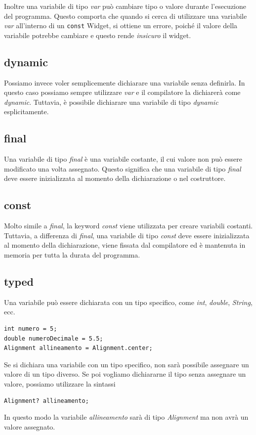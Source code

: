 \documentclass[12pt]{article}
\begin{document}
Inoltre una variabile di tipo \textit{var} può cambiare tipo o valore
durante l'esecuzione del programma.
Questo comporta che quando si cerca di utilizzare una variabile
\textit{var} all'interno di un \texttt{const} Widget, si ottiene
un errore, poiché il valore della variabile potrebbe cambiare e
questo rende \textit{insicuro} il widget.

\subsection{dynamic}
Possiamo invece voler semplicemente dichiarare una variabile
senza definirla. In questo caso possiamo sempre utilizzare \textit{var}
e il compilatore la dichiarerà come \textit{dynamic}.
Tuttavia, è possibile dichiarare una variabile di tipo \textit{dynamic}
esplicitamente.

\subsection{final}
Una variabile di tipo \textit{final} è una variabile costante,
il cui valore non può essere modificato una volta assegnato.
Questo significa che una variabile di tipo \textit{final} deve essere
inizializzata al momento della dichiarazione o nel costruttore.

\subsection{const}
Molto simile a \textit{final}, la keyword \textit{const} viene utilizzata
per creare variabili costanti. Tuttavia, a differenza di \textit{final},
una variabile di tipo \textit{const} deve essere inizializzata al momento
della dichiarazione, viene fissata dal compilatore ed
è mantenuta in memoria per tutta la durata del programma.


\subsection{typed}
Una variabile può essere dichiarata con un tipo specifico,
come \textit{int}, \textit{double}, \textit{String}, ecc.
\begin{highlight}
\begin{verbatim}
int numero = 5;
double numeroDecimale = 5.5;
Alignment allineamento = Alignment.center;
\end{verbatim}
\end{highlight}
Se si dichiara una variabile con un tipo specifico, non sarà possibile
assegnare un valore di un tipo diverso. Se poi vogliamo dichiararne
il tipo senza assegnare un valore, possiamo utilizzare la sintassi
\begin{highlight}
\begin{verbatim}
Alignment? allineamento;
\end{verbatim}
\end{highlight}
In questo modo la variabile \textit{allineamento} sarà di tipo \textit{Alignment}
ma non avrà un valore assegnato.
\end{document}
